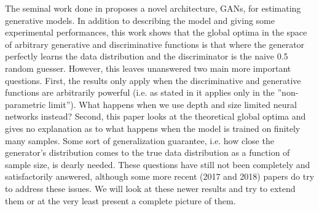 \documentclass[11pt]{hw-template}
\begin{document}
\maketitle

The seminal work done in \cite{NIPS2014_5423} proposes a novel architecture, GANs, for estimating generative models. In addition to describing the model and giving some experimental performances, 
this work shows that the global optima in the space of arbitrary generative and discriminative functions is that where the generator perfectly learns the data distribution and the discriminator is 
the naive 0.5 random guesser. However, this leaves unanswered two main more important questions. First, the results only apply when the discriminative and generative functions are arbitrarily powerful 
(i.e. as stated in \cite{NIPS2014_5423} it applies only in the ''non-parametric limit''). What happens when we use depth and size limited neural networks instead? Second, this paper looks at the 
theoretical global optima and gives no explanation as to what happens when the model is trained on finitely many samples. Some sort of generalization guarantee, i.e. how close the generator's distribution 
comes to the true data distribution as a function of sample size, is dearly needed. These questions have still not been completely and satisfactorily answered, although some more recent (2017 and 2018) papers
do try to address these issues. We will look at these newer results and try to extend them or at the very least present a complete picture of them.


 
\end{document}

